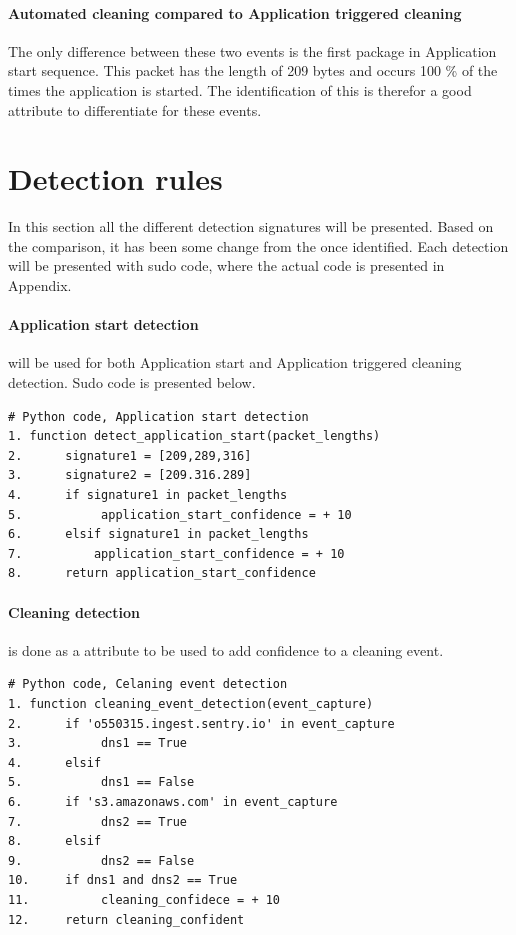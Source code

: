 \paragraph{Automated cleaning compared to Application triggered cleaning}
The only difference between these two events is the first package in Application start sequence. This packet has the length of 209 bytes and occurs 100 \% of the times the application is started. The identification of this is therefor a good attribute to differentiate for these events.

\section{Detection rules}
In this section all the different detection signatures will be presented. Based on the comparison, it has been some change from the once identified. Each detection will be presented with sudo code, where the actual code is presented in Appendix. 

\paragraph{Application start detection} will be used for both Application start and Application triggered cleaning detection. Sudo code is presented below.

\begin{lstlisting}
# Python code, Application start detection
1. function detect_application_start(packet_lengths)
2.      signature1 = [209,289,316]
3.      signature2 = [209.316.289]
4.      if signature1 in packet_lengths
5.           application_start_confidence = + 10
6.      elsif signature1 in packet_lengths
7.          application_start_confidence = + 10
8.      return application_start_confidence
\end{lstlisting}

\paragraph{Cleaning detection} is done as a attribute to be used to add confidence to a cleaning event. 
\begin{lstlisting}
# Python code, Celaning event detection
1. function cleaning_event_detection(event_capture)
2.      if 'o550315.ingest.sentry.io' in event_capture
3.           dns1 == True
4.      elsif
5.           dns1 == False
6.      if 's3.amazonaws.com' in event_capture
7.           dns2 == True
8.      elsif
9.           dns2 == False
10.     if dns1 and dns2 == True      
11.          cleaning_confidece = + 10
12.     return cleaning_confident
\end{lstlisting}

